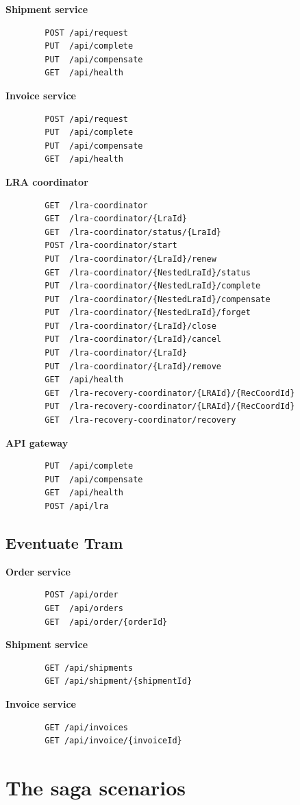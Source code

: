 \documentclass[oneside,
  digital, %
  table,   %
  nolof,     %
  nolot,     %
]{fithesis3}
\begin{document}
\noindent
\textbf{Shipment service}

\begin{verbatim}
        POST /api/request
        PUT  /api/complete
        PUT  /api/compensate
        GET  /api/health
\end{verbatim}

\noindent
\textbf{Invoice service}

\begin{verbatim}
        POST /api/request
        PUT  /api/complete
        PUT  /api/compensate
        GET  /api/health
\end{verbatim}

\noindent
\textbf{LRA coordinator}

\begin{verbatim}
        GET  /lra-coordinator
        GET  /lra-coordinator/{LraId}
        GET  /lra-coordinator/status/{LraId}
        POST /lra-coordinator/start
        PUT  /lra-coordinator/{LraId}/renew
        GET  /lra-coordinator/{NestedLraId}/status
        PUT  /lra-coordinator/{NestedLraId}/complete
        PUT  /lra-coordinator/{NestedLraId}/compensate
        PUT  /lra-coordinator/{NestedLraId}/forget
        PUT  /lra-coordinator/{LraId}/close
        PUT  /lra-coordinator/{LraId}/cancel
        PUT  /lra-coordinator/{LraId}
        PUT  /lra-coordinator/{LraId}/remove
        GET  /api/health
        GET  /lra-recovery-coordinator/{LRAId}/{RecCoordId}
        PUT  /lra-recovery-coordinator/{LRAId}/{RecCoordId}
        GET  /lra-recovery-coordinator/recovery
\end{verbatim}

\noindent
\textbf{API gateway}

\begin{verbatim}
        PUT  /api/complete
        PUT  /api/compensate
        GET  /api/health
        POST /api/lra
\end{verbatim}


\section{Eventuate Tram}

\textbf{Order service}

\begin{verbatim}
        POST /api/order
        GET  /api/orders
        GET  /api/order/{orderId}
\end{verbatim}

\noindent
\textbf{Shipment service}

\begin{verbatim}
        GET /api/shipments
        GET /api/shipment/{shipmentId}
\end{verbatim}

\noindent
\textbf{Invoice service}

\begin{verbatim}
        GET /api/invoices
        GET /api/invoice/{invoiceId}
\end{verbatim}




\chapter{The saga scenarios}
\end{document}
